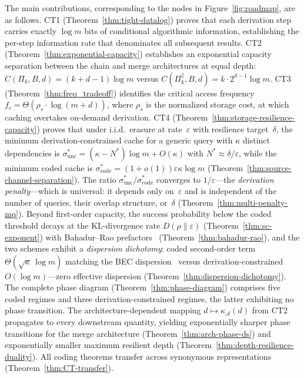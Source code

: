 \documentclass[journal]{IEEEtran}
\numberwithin{equation}{section}
\begin{document}
The main contributions, corresponding to the nodes in
Figure~\ref{fig:roadmap}, are as follows.
CT1 (Theorem~\ref{thm:tight-datalog}) proves that each derivation step carries
exactly $\log m$ bits of conditional algorithmic information, establishing the
per-step information rate that denominates all subsequent results.
CT2 (Theorem~\ref{thm:exponential-capacity}) establishes an exponential capacity
separation between the chain and merge architectures at equal depth:
$C(\Pi_k,B,d)=(k{+}d{-}1)\log m$ versus
$C(\Pi_k^{\parallel},B,d)=k\cdot 2^{d-1}\log m$.
CT3 (Theorem~\ref{thm:freq_tradeoff}) identifies the critical access frequency
$f_c=\Theta(\rho_s\cdot\log(m{+}d))$, where $\rho_s$ is the normalized storage
cost, at which caching overtakes on-demand derivation.
CT4 (Theorem~\ref{thm:storage-resilience-capacity}) proves that under i.i.d.\
erasure at rate~$\varepsilon$ with resilience target~$\delta$, the minimum
derivation-constrained cache for a generic query with $\kappa$ distinct
dependencies is $\sigma^*_{\mathrm{unc}}=(\kappa{-}N^*)\log m+O(\kappa)$ with
$N^*\approx\delta/\varepsilon$, while the minimum coded cache is
$\sigma^*_{\mathrm{code}}=(1{+}o(1))\varepsilon\kappa\log m$
(Theorem~\ref{thm:source-channel-separation}).
The ratio $\sigma^*_{\mathrm{unc}}/\sigma^*_{\mathrm{code}}$ converges to
$1/\varepsilon$---the \emph{derivation penalty}---which is universal: it depends
only on~$\varepsilon$ and is independent of the number of queries, their overlap
structure, or~$\delta$ (Theorem~\ref{thm:multi-penalty-mq}).
Beyond first-order capacity, the success probability below the coded threshold
decays at the KL-divergence rate $D(\rho\|\varepsilon)$
(Theorem~\ref{thm:sc-exponent}) with Bahadur--Rao
prefactors~\cite{bahadur1960deviations} (Theorem~\ref{thm:bahadur-rao}), and the
two schemes exhibit a \emph{dispersion dichotomy}: coded second-order term
$\Theta(\sqrt\kappa\,\log m)$ matching the BEC
dispersion~\cite{polyanskiy2010channel} versus derivation-constrained
$O(\log m)$---zero effective dispersion
(Theorem~\ref{thm:dispersion-dichotomy}).
The complete phase diagram (Theorem~\ref{thm:phase-diagram}) comprises five coded
regimes and three derivation-constrained regimes, the latter exhibiting no phase
transition.
The architecture-dependent mapping $d\mapsto\kappa_{\mathcal A}(d)$ from CT2
propagates to every downstream quantity, yielding exponentially sharper phase
transitions for the merge architecture (Theorem~\ref{thm:arch-phase-ds}) and
exponentially smaller maximum resilient depth
(Theorem~\ref{thm:depth-resilience-duality}).
All coding theorems transfer across synonymous representations
(Theorem~\ref{thm:CT-transfer}).
\end{document}
